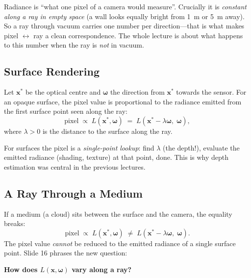 \documentclass[11pt,a4paper]{article}
\newcommand{\x}{{\bm{x}}}
\newcommand{\w}{{\bm{\omega}}}
\theoremstyle{definition}
\theoremstyle{plain}
\theoremstyle{remark}
\begin{document}
\begin{intuition}
Radiance is ``what one pixel of a camera would measure''. Crucially it is \emph{constant along a ray in empty space} (a wall looks equally bright from 1~m or 5~m away). So a ray through vacuum carries one number per direction---that is what makes pixel $\leftrightarrow$ ray a clean correspondence. The whole lecture is about what happens to this number when the ray is \emph{not} in vacuum.
\end{intuition}

\subsection{Surface Rendering}

Let $\x^*$ be the optical centre and $\w$ the direction from $\x^*$ towards the sensor. For an opaque surface, the pixel value is proportional to the radiance emitted from the first surface point seen along the ray:
\[
\text{pixel}\;\propto\;L(\x^*,\w)\;=\;L(\x^*-\lambda\w,\;\w),
\]
where $\lambda>0$ is the distance to the surface along the ray.

\begin{intuition}
For surfaces the pixel is a \emph{single-point lookup}: find $\lambda$ (the depth!), evaluate the emitted radiance (shading, texture) at that point, done. This is why depth estimation was central in the previous lectures.
\end{intuition}

\subsection{A Ray Through a Medium}

If a medium (a cloud) sits between the surface and the camera, the equality breaks:
\[
\text{pixel}\;\propto\;L(\x^*,\w)\;\neq\;L(\x^*-\lambda\w,\;\w).
\]
The pixel value \emph{cannot} be reduced to the emitted radiance of a single surface point. Slide 16 phrases the new question:

\begin{center}\textbf{How does $L(\x,\w)$ vary along a ray?}\end{center}
\end{document}
